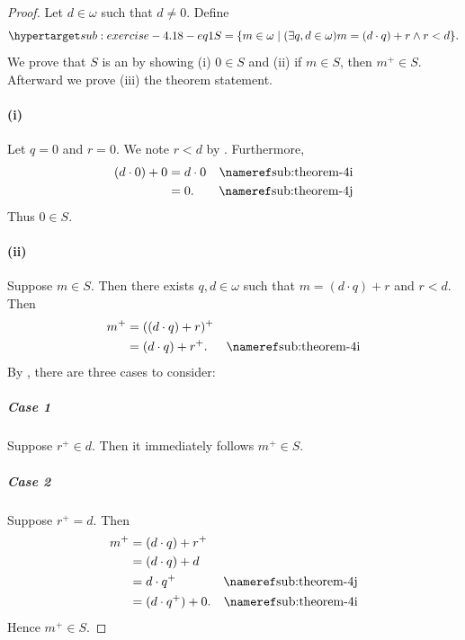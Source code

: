 \documentclass{report}
\begin{document}
  \begin{proof}

    Let $d \in \omega$ such that $d \neq 0$.
    Define
      \begin{equation}
        \hyperlabel{sub:exercise-4.18-eq1}
        S = \{m \in \omega \mid
          (\exists q, d \in \omega) m = (d \cdot q) + r \land r < d\}.
      \end{equation}
    We prove that $S$ is an  by showing
      (i) $0 \in S$ and (ii) if $m \in S$, then $m^+ \in S$.
    Afterward we prove (iii) the theorem statement.

    \paragraph{(i)}%

      Let $q = 0$ and $r = 0$.
      We note $r < d$ by .
      Furthermore,
        \begin{align*}
          (d \cdot 0) + 0
            & = d \cdot 0 & \textref{sub:theorem-4i} \\
            & = 0. & \textref{sub:theorem-4j}
        \end{align*}
      Thus $0 \in S$.

    \paragraph{(ii)}%

      Suppose $m \in S$.
      Then there exists $q, d \in \omega$ such that $m = (d \cdot q) + r$ and
        $r < d$.
      Then
        \begin{align*}
          m^+
            & = ((d \cdot q) + r)^+ \\
            & = (d \cdot q) + r^+. & \textref{sub:theorem-4i}
        \end{align*}
      By , there are three cases to
        consider:

      \subparagraph{Case 1}%

        Suppose $r^+ \in d$.
        Then it immediately follows $m^+ \in S$.

      \subparagraph{Case 2}%

        Suppose $r^+ = d$.
        Then
          \begin{align*}
            m^+
              & = (d \cdot q) + r^+ \\
              & = (d \cdot q) + d \\
              & = d \cdot q^+ & \textref{sub:theorem-4j} \\
              & = (d \cdot q^+) + 0. & \textref{sub:theorem-4i}
          \end{align*}
        Hence $m^+ \in S$.


\end{proof}
\end{document}
